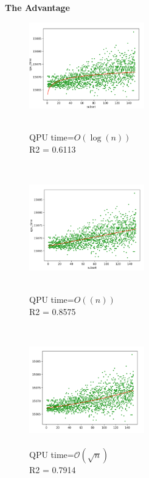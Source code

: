 \documentclass[oneside,a4paper]{article}
\begin{document}
\textbf{The Advantage}

\begin{figure}[htp]
\begin{minipage}[b]{4.5cm}
\includegraphics[width=5cm]{LaTeXTemplate/Images/AdvantagePossibleFitting1.png}
\caption{\\QPU time=$O(\log(n))$\\
R2 = 0.6113 \\
}
\end{minipage}
\ \hspace{2mm} \hspace{2mm} \
\begin{minipage}[b]{5cm}
\includegraphics[width=5cm]{LaTeXTemplate/Images/AdvantagePossibleFitting2.png}
\caption{\\QPU time=$O((n))$\\
{\color{ForestGreen} R2 = 0.8575\\}}
\end{minipage}
\ \hspace{2mm} \hspace{2mm} \
\begin{minipage}[b]{4.5cm}
\centering
\includegraphics[width=5cm]{LaTeXTemplate/Images/AdvantagePossibleFitting3.png}
\caption{\\QPU time=$\mathcal{O}(\sqrt{n})$\\
R2 = 0.7914 \\}
\end{minipage}
\end{figure}
\end{document}
